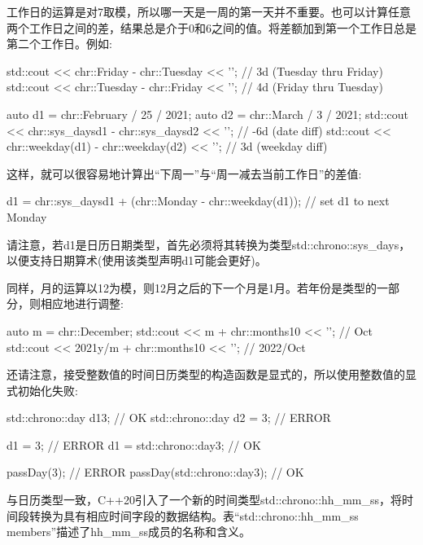 工作日的运算是对7取模，所以哪一天是一周的第一天并不重要。也可以计算任意两个工作日之间的差，结果总是介于0和6之间的值。将差额加到第一个工作日总是第二个工作日。例如:

\begin{cpp}
std::cout << chr::Friday - chr::Tuesday << '\n'; // 3d (Tuesday thru Friday)
std::cout << chr::Tuesday - chr::Friday << '\n'; // 4d (Friday thru Tuesday)

auto d1 = chr::February / 25 / 2021;
auto d2 = chr::March / 3 / 2021;
std::cout << chr::sys_days{d1} - chr::sys_days{d2} << '\n'; // -6d (date diff)
std::cout << chr::weekday(d1) - chr::weekday(d2) << '\n'; // 3d (weekday diff)
\end{cpp}

这样，就可以很容易地计算出“下周一”与“周一减去当前工作日”的差值:

\begin{cpp}
d1 = chr::sys_days{d1} + (chr::Monday - chr::weekday(d1)); // set d1 to next Monday
\end{cpp}

请注意，若d1是日历日期类型，首先必须将其转换为类型std::chrono::sys\_days，以便支持日期算术(使用该类型声明d1可能会更好)。

同样，月的运算以12为模，则12月之后的下一个月是1月。若年份是类型的一部分，则相应地进行调整:

\begin{cpp}
auto m = chr::December;
std::cout << m + chr::months{10} << '\n'; // Oct
std::cout << 2021y/m + chr::months{10} << '\n'; // 2022/Oct
\end{cpp}

还请注意，接受整数值的时间日历类型的构造函数是显式的，所以使用整数值的显式初始化失败:

\begin{cpp}
std::chrono::day d1{3}; // OK
std::chrono::day d2 = 3; // ERROR

d1 = 3; // ERROR
d1 = std::chrono::day{3}; // OK

passDay(3); // ERROR
passDay(std::chrono::day{3}); // OK
\end{cpp}


与日历类型一致，C++20引入了一个新的时间类型std::chrono::hh\_mm\_ss，将时间段转换为具有相应时间字段的数据结构。表“std::chrono::hh\_mm\_ss members”描述了hh\_mm\_ss成员的名称和含义。

